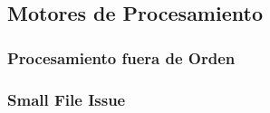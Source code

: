 \subsection{Motores de Procesamiento}
\subsubsection{Procesamiento fuera de Orden}
\subsubsection{Small File Issue}